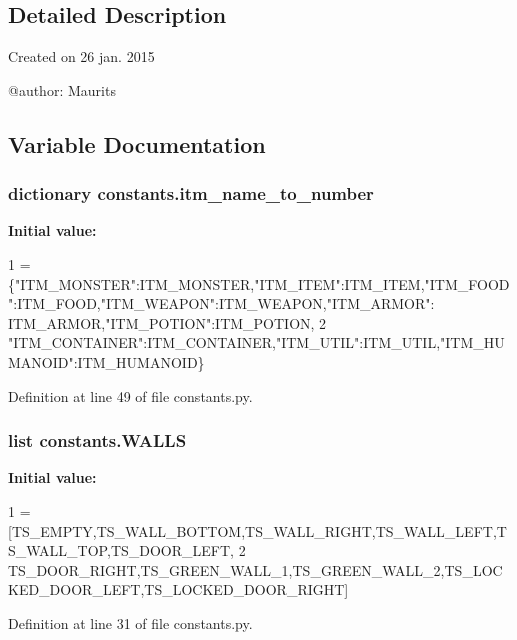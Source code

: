 \subsection{Detailed Description}
\begin{DoxyVerb}Created on 26 jan. 2015

@author: Maurits
\end{DoxyVerb}
 

\subsection{Variable Documentation}
\hypertarget{namespaceconstants_a3fad82b0f423bb020e3eb5110139e377}{}
\subsubsection[{itm\+\_\+name\+\_\+to\+\_\+number}]{\setlength{\rightskip}{0pt plus 5cm}dictionary constants.\+itm\+\_\+name\+\_\+to\+\_\+number}\label{namespaceconstants_a3fad82b0f423bb020e3eb5110139e377}
{\bfseries Initial value\+:}
\begin{DoxyCode}
1 = \{\textcolor{stringliteral}{"ITM\_MONSTER"}:ITM\_MONSTER,\textcolor{stringliteral}{"ITM\_ITEM"}:ITM\_ITEM,\textcolor{stringliteral}{"ITM\_FOOD"}:ITM\_FOOD,\textcolor{stringliteral}{"ITM\_WEAPON"}:ITM\_WEAPON,\textcolor{stringliteral}{"ITM\_ARMOR"}:
      ITM\_ARMOR,\textcolor{stringliteral}{"ITM\_POTION"}:ITM\_POTION,
2                 \textcolor{stringliteral}{"ITM\_CONTAINER"}:ITM\_CONTAINER,\textcolor{stringliteral}{"ITM\_UTIL"}:ITM\_UTIL,\textcolor{stringliteral}{"ITM\_HUMANOID"}:ITM\_HUMANOID\}
\end{DoxyCode}


Definition at line 49 of file constants.\+py.

\hypertarget{namespaceconstants_ab7975d0e5ba674989e909d1881c6f7ae}{}
\subsubsection[{W\+A\+L\+L\+S}]{\setlength{\rightskip}{0pt plus 5cm}list constants.\+W\+A\+L\+L\+S}\label{namespaceconstants_ab7975d0e5ba674989e909d1881c6f7ae}
{\bfseries Initial value\+:}
\begin{DoxyCode}
1 = [TS\_EMPTY,TS\_WALL\_BOTTOM,TS\_WALL\_RIGHT,TS\_WALL\_LEFT,TS\_WALL\_TOP,TS\_DOOR\_LEFT,
2        TS\_DOOR\_RIGHT,TS\_GREEN\_WALL\_1,TS\_GREEN\_WALL\_2,TS\_LOCKED\_DOOR\_LEFT,TS\_LOCKED\_DOOR\_RIGHT]
\end{DoxyCode}


Definition at line 31 of file constants.\+py.

